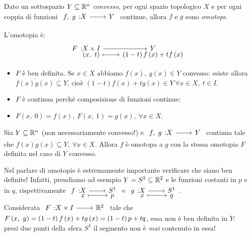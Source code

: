 \begin{example}\label{convessoomotope}
	Dato un sottospazio $Y\subseteq \mathbb{R}^n$ \textit{convesso}, per ogni spazio topologico $X$ e per ogni coppia di funzioni $\funz{f,\ g}{X}{Y}$ continue, allora $f$ e $g$ sono \textit{omotope}.
\end{example}
\begin{demonstration}
	L'omotopia è:
	\begin{equation*}
		\funztot{F}{X\times I}{Y}{\left(x,\ t\right)}{\left(1-t\right)f\left(x\right)+tf\left(x\right)}
	\end{equation*}
\begin{itemize}
	\item $F$ è ben definita. Se $x\in X$ abbiamo $f\left(x\right),\ g\left(x\right)\in Y$ convesso: esiste allora $\overline{f\left(x\right)g\left(x\right)}\subseteq Y$, cioè $\left(1-t\right)f\left(x\right)+tg\left(x\right)\in Y\ \forall x\in X,\ t\in I$.
	\item $F$ è continua perché composizione di funzioni continue:
	\begin{center}
	\end{center}
\item $F\left(x,\ 0\right)=f\left(x\right),\ F\left(x,\ 1\right)=g\left(x\right),\ \forall x\in X$.
\end{itemize}
\vspace{-3mm}
\end{demonstration}
\begin{observe}\label{omotopiasegmento}
	Sia $Y\subseteq \mathbb{R}^n$ (non necessariamente convesso!) e $\funz{f,\ g}{X}{Y}$ continua tale che $\overline{f\left(x\right)g\left(x\right)}\subseteq Y,\ \forall x\in X$. Allora $f$ è omotopa a $g$ con la stessa omotopia $F$ definita nel caso di $Y$ convesso.
\end{observe}
\begin{attention}
Nel parlare di omotopie è estremamente importante verificare che siano ben definite! Infatti, prendiamo ad esempio $Y=S^1\subseteq \mathbb{R}^2$ e le funzioni costanti in $p$ e in $q$, rispettivamente $\funztot{f}{X}{S^1}{x}{p}$ e $\funztot{g}{X}{S^1}{x}{q}$.\\
Considerata $\funz{F}{X\times I}{\realset^2}$ tale che $F\left(x,\ y\right)=\left(1-t\right)f\left(x\right)+tg\left(x\right)=\left(1-t\right)p+tq$, essa non è ben definita in $Y$: presi due punti della sfera $S^1$ il segmento non è \textit{mai} contenuto in essa!
\end{attention}
